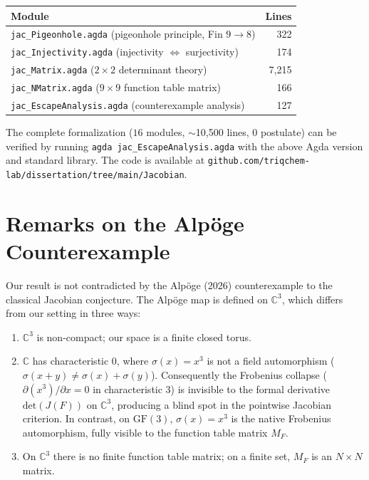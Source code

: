 \documentclass[a4paper,11pt]{article}
\theoremstyle{definition}
\theoremstyle{remark}
\newcommand{\GF}{\mathrm{GF}}
\newcommand{\C}{\mathbb{C}}
\newcommand{\MF}{M_F}
\newcommand{\Det}{\mathrm{det}}
\newcommand{\Jac}{J(F)}
\newcommand{\Frob}{\sigma}
\begin{document}
\begin{center}
\begin{tabular}{l r}
\hline
Module & Lines \\
\hline
\texttt{jac\_Pigeonhole.agda} (pigeonhole principle, Fin $9\to8$) & 322 \\
\texttt{jac\_Injectivity.agda} (injectivity $\iff$ surjectivity) & 174 \\
\texttt{jac\_Matrix.agda} ($2\times2$ determinant theory) & 7,215 \\
\texttt{jac\_NMatrix.agda} ($9\times9$ function table matrix) & 166 \\
\texttt{jac\_EscapeAnalysis.agda} (counterexample analysis) & 127 \\
\hline
\end{tabular}
\end{center}

The complete formalization ($16$ modules, $\sim$10,500 lines, $0$ postulate)
can be verified by running \texttt{agda jac\_EscapeAnalysis.agda} with the
above Agda version and standard library.
The code is available at
\texttt{github.com/triqchem-lab/dissertation/tree/main/Jacobian}.

\section{Remarks on the Alp\"{o}ge Counterexample}

Our result is not contradicted by the Alp\"{o}ge (2026) counterexample to
the classical Jacobian conjecture. The Alp\"{o}ge map is defined on $\C^3$,
which differs from our setting in three ways:

\begin{enumerate}
\item $\C^3$ is non-compact; our space is a finite closed torus.
\item $\C$ has characteristic $0$, where $\Frob(x)=x^3$ is not a field
automorphism ($\Frob(x+y)\neq\Frob(x)+\Frob(y)$). Consequently the
Frobenius collapse ($\partial(x^3)/\partial x=0$ in characteristic $3$) is
invisible to the formal derivative $\Det(\Jac)$ on $\C^3$, producing a
blind spot in the pointwise Jacobian criterion. In contrast, on $\GF(3)$,
$\Frob(x)=x^3$ is the native Frobenius automorphism, fully visible to
the function table matrix $\MF$.
\item On $\C^3$ there is no finite function table matrix; on a finite set,
$\MF$ is an $N\times N$ matrix.
\end{enumerate}
\end{document}
